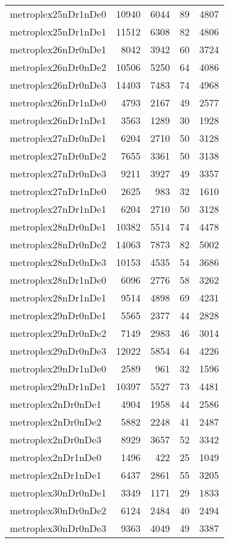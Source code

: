 \begin{longtable}{lrrrr}
metroplex25nDr1nDe0 & 10940 & 6044 & 89 & 4807 \\
metroplex25nDr1nDe1 & 11512 & 6308 & 82 & 4806 \\
metroplex26nDr0nDe1 & 8042 & 3942 & 60 & 3724 \\
metroplex26nDr0nDe2 & 10506 & 5250 & 64 & 4086 \\
metroplex26nDr0nDe3 & 14403 & 7483 & 74 & 4968 \\
metroplex26nDr1nDe0 & 4793 & 2167 & 49 & 2577 \\
metroplex26nDr1nDe1 & 3563 & 1289 & 30 & 1928 \\
metroplex27nDr0nDe1 & 6204 & 2710 & 50 & 3128 \\
metroplex27nDr0nDe2 & 7655 & 3361 & 50 & 3138 \\
metroplex27nDr0nDe3 & 9211 & 3927 & 49 & 3357 \\
metroplex27nDr1nDe0 & 2625 & 983 & 32 & 1610 \\
metroplex27nDr1nDe1 & 6204 & 2710 & 50 & 3128 \\
metroplex28nDr0nDe1 & 10382 & 5514 & 74 & 4478 \\
metroplex28nDr0nDe2 & 14063 & 7873 & 82 & 5002 \\
metroplex28nDr0nDe3 & 10153 & 4535 & 54 & 3686 \\
metroplex28nDr1nDe0 & 6096 & 2776 & 58 & 3262 \\
metroplex28nDr1nDe1 & 9514 & 4898 & 69 & 4231 \\
metroplex29nDr0nDe1 & 5565 & 2377 & 44 & 2828 \\
metroplex29nDr0nDe2 & 7149 & 2983 & 46 & 3014 \\
metroplex29nDr0nDe3 & 12022 & 5854 & 64 & 4226 \\
metroplex29nDr1nDe0 & 2589 & 961 & 32 & 1596 \\
metroplex29nDr1nDe1 & 10397 & 5527 & 73 & 4481 \\
metroplex2nDr0nDe1 & 4904 & 1958 & 44 & 2586 \\
metroplex2nDr0nDe2 & 5882 & 2248 & 41 & 2487 \\
metroplex2nDr0nDe3 & 8929 & 3657 & 52 & 3342 \\
metroplex2nDr1nDe0 & 1496 & 422 & 25 & 1049 \\
metroplex2nDr1nDe1 & 6437 & 2861 & 55 & 3205 \\
metroplex30nDr0nDe1 & 3349 & 1171 & 29 & 1833 \\
metroplex30nDr0nDe2 & 6124 & 2484 & 40 & 2494 \\
metroplex30nDr0nDe3 & 9363 & 4049 & 49 & 3387 \\

\end{longtable}
